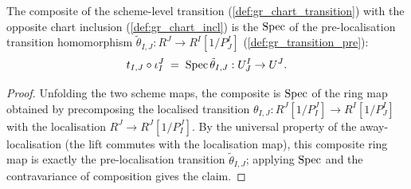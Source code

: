 \begin{lemma}\leanok
  \label{lem:gr_chartTransition_comp_chartIncl}
  The composite of the scheme-level transition
  (\cref{def:gr_chart_transition}) with the opposite chart inclusion
  (\cref{def:gr_chart_incl}) is the \(\operatorname{Spec}\) of the pre-localisation transition
  homomorphism \(\tilde\theta_{I,J} : R^J \to R^I[1/P^I_J]\)
  (\cref{def:gr_transition_pre}):
  \[
    t_{I,J} \circ \iota^J_I \;=\; \operatorname{Spec} \tilde\theta_{I,J} :
      U^I_J \to U^J .
  \]
\end{lemma}
\begin{proof}
  \leanok
  Unfolding the two scheme maps, the composite is \(\operatorname{Spec}\) of the ring map
  obtained by precomposing the localised transition \(\theta_{I,J} :
  R^J[1/P^J_I] \to R^I[1/P^I_J]\) with the localisation \(R^J \to R^J[1/P^J_I]\).
  By the universal property of the away-localisation (the lift commutes with the
  localisation map), this composite ring map is exactly the pre-localisation
  transition \(\tilde\theta_{I,J}\); applying \(\operatorname{Spec}\) and the contravariance of
  composition gives the claim.
\end{proof}

